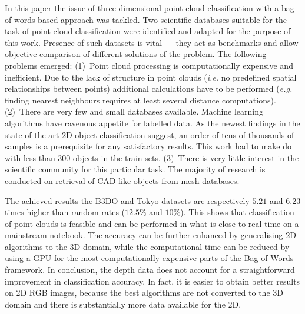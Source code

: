 \documentclass[12pt]{article}
\begin{document}
  In this paper the issue of three dimensional point cloud classification with 
a bag of words-based approach was tackled. Two scientific databases suitable 
for the task of point cloud classification were identified and adapted for the 
purpose of this work. Presence of such datasets is vital --- they act as 
benchmarks and allow objective comparison of different solutions of the 
problem. The following problems emerged: (1)~Point cloud processing is 
computationally expensive and inefficient. Due to the lack of structure in 
point clouds (\textit{i.e.} no predefined spatial relationships between points) 
additional calculations have to be performed (\textit{e.g.} finding nearest 
neighbours requires at least several distance computations). (2)~There are very 
few and small databases available. Machine learning algorithms have ravenous 
appetite for labelled data. As the newest findings in the state-of-the-art 2D 
object classification suggest, an order of tens of thousands of samples is a 
prerequisite for any satisfactory results. This work had to make do with less 
than 300 objects in the train sets. (3)~There is very little interest in the 
scientific community for this particular task. The majority of research is 
conducted on retrieval of CAD-like objects from mesh databases.
  
  The achieved results the B3DO and Tokyo datasets are respectively $5.21$ and 
$6.23$ times higher than random rates ($12.5\%$ and $10\%$). This shows that 
classification of point clouds is feasible and can be performed in what is 
close to real time on a mainstream notebook. The accuracy can be further 
enhanced by generalising 2D algorithms to the 3D domain, while the 
computational time can be reduced by using a GPU for the most computationally 
expensive parts of the Bag of Words framework. In conclusion, the depth data 
does not account for a straightforward improvement in classification accuracy. 
In fact, it is easier to obtain better results on 2D RGB images, because the 
best algorithms are not converted to the 3D domain and there is substantially 
more data available for the 2D. 


\end{document}
